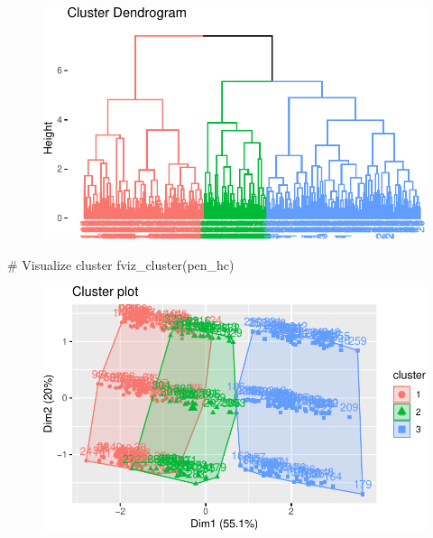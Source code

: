 \documentclass[
  letterpaper,
  DIV=11,
  numbers=noendperiod]{scrreprt}
\newenvironment{Shaded}{\begin{snugshade}}{\end{snugshade}}
\newcommand{\CommentTok}[1]{\textcolor[rgb]{0.37,0.37,0.37}{#1}}
\newcommand{\FunctionTok}[1]{\textcolor[rgb]{0.28,0.35,0.67}{#1}}
\newcommand{\NormalTok}[1]{\textcolor[rgb]{0.00,0.23,0.31}{#1}}
\begin{document}
\begin{figure}[H]

{\centering \includegraphics{./12-clustering_files/figure-pdf/unnamed-chunk-10-1.pdf}

}

\end{figure}

\begin{Shaded}
\begin{Highlighting}[]
\CommentTok{\# Visualize cluster}
\FunctionTok{fviz\_cluster}\NormalTok{(pen\_hc)}
\end{Highlighting}
\end{Shaded}

\begin{figure}[H]

{\centering \includegraphics{./12-clustering_files/figure-pdf/unnamed-chunk-10-2.pdf}

}

\end{figure}
\end{document}
